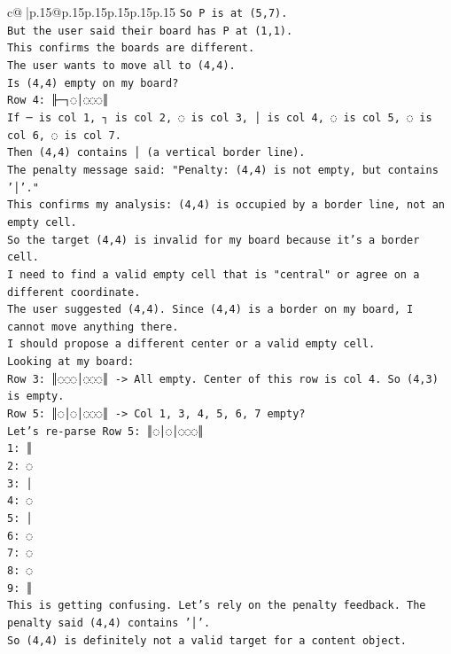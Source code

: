 \documentclass{article}
\begin{document}
{\begin{supertabular}{c@{$\;$}|p{.15\linewidth}@{}p{.15\linewidth}p{.15\linewidth}p{.15\linewidth}p{.15\linewidth}p{.15\linewidth}}
{{{\texttt{So P is at (5,7).} \\
\texttt{But the user said their board has P at (1,1).} \\
\texttt{This confirms the boards are different.} \\
\texttt{The user wants to move all to (4,4).} \\
\texttt{Is (4,4) empty on my board?} \\
\texttt{Row 4: ╟─┐◌│◌◌◌║} \\
\texttt{If ─ is col 1, ┐ is col 2, ◌ is col 3, │ is col 4, ◌ is col 5, ◌ is col 6, ◌ is col 7.} \\
\texttt{Then (4,4) contains │ (a vertical border line).} \\
\texttt{The penalty message said: "Penalty: (4,4) is not empty, but contains '│'."} \\
\texttt{This confirms my analysis: (4,4) is occupied by a border line, not an empty cell.} \\
\texttt{So the target (4,4) is invalid for my board because it's a border cell.} \\
\texttt{I need to find a valid empty cell that is "central" or agree on a different coordinate.} \\
\texttt{The user suggested (4,4). Since (4,4) is a border on my board, I cannot move anything there.} \\
\texttt{I should propose a different center or a valid empty cell.} \\
\texttt{Looking at my board:} \\
\texttt{Row 3: ║◌◌◌│◌◌◌║ {-}> All empty. Center of this row is col 4. So (4,3) is empty.} \\
\texttt{Row 5: ║◌│◌│◌◌◌║ {-}> Col 1, 3, 4, 5, 6, 7 empty?} \\
\texttt{Let's re{-}parse Row 5: ║◌│◌│◌◌◌║} \\
\texttt{1: ║} \\
\texttt{2: ◌} \\
\texttt{3: │} \\
\texttt{4: ◌} \\
\texttt{5: │} \\
\texttt{6: ◌} \\
\texttt{7: ◌} \\
\texttt{8: ◌} \\
\texttt{9: ║} \\
\texttt{This is getting confusing. Let's rely on the penalty feedback. The penalty said (4,4) contains '│'.} \\
\texttt{So (4,4) is definitely not a valid target for a content object.} \\
}}}
\end{supertabular}}
\end{document}
